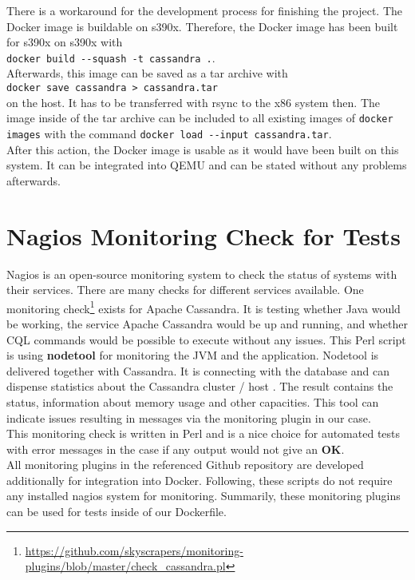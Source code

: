 There is a workaround for the development process for finishing the project. The Docker image is buildable on s390x. Therefore, the Docker image has been built for s390x on s390x with \\  
\lstinline!docker build --squash -t cassandra .!. \\
Afterwards, this image can be saved as a tar archive with \\
\lstinline!docker save cassandra > cassandra.tar!\\ 
on the host. It has to be transferred with rsync to the x86 system then. The image inside of the tar archive can be included to all existing images of \lstinline!docker images! with the command 
\lstinline!docker load --input cassandra.tar!. \\
After this action, the Docker image is usable as it would have been built on this system. 
It can be integrated into QEMU and can be stated without any problems afterwards.

\section{Nagios Monitoring Check for Tests} \label{monitoring}

Nagios is an open-source monitoring system to check the status of systems with their services. There are many checks for different services available. One monitoring check\footnote{\url{https://github.com/skyscrapers/monitoring-plugins/blob/master/check_cassandra.pl}} exists for Apache Cassandra. It is testing whether Java would be working, the service Apache Cassandra would be up and running, and whether CQL commands would be possible to execute without any issues. This Perl script is using \textbf{nodetool} for monitoring the JVM and the application. Nodetool is delivered together with Cassandra. It is connecting with the database and can dispense statistics about the Cassandra cluster / host \cite[~p.256]{Carpenter2020}. The result contains the status, information about memory usage and other capacities. This tool can indicate issues resulting in messages via the monitoring plugin in our case.\\
This monitoring check is written in Perl and is a nice choice for automated tests with error messages in the case if any output would not give an \textbf{OK}. \\
All monitoring plugins in the referenced Github repository are developed additionally for integration into Docker. Following, these scripts do not require any installed nagios system for monitoring.
Summarily, these monitoring plugins can be used for tests inside of our Dockerfile.


